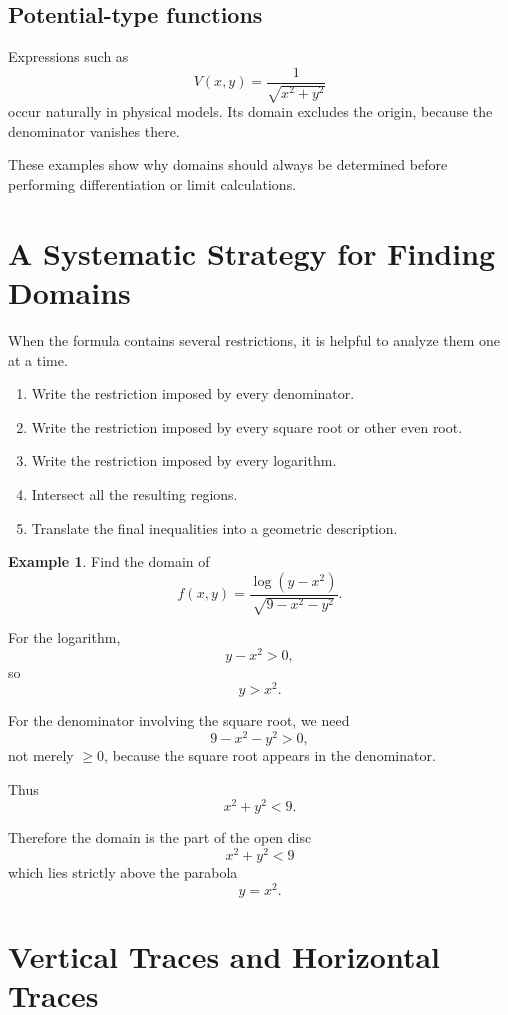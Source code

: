 \documentclass[11pt,oneside]{book}
\theoremstyle{studentthm}
\theoremstyle{definition}
\newtheorem{example}[theorem]{Example}
\begin{document}
\subsection*{Potential-type functions}

Expressions such as
\[
V(x,y)=\frac{1}{\sqrt{x^2+y^2}}
\]
occur naturally in physical models. Its domain excludes the origin,
because the denominator vanishes there.

These examples show why domains should always be determined before
performing differentiation or limit calculations.

\section{A Systematic Strategy for Finding Domains}

When the formula contains several restrictions, it is helpful to
analyze them one at a time.

\begin{enumerate}
\item Write the restriction imposed by every denominator.

\item Write the restriction imposed by every square root or other even
root.

\item Write the restriction imposed by every logarithm.

\item Intersect all the resulting regions.

\item Translate the final inequalities into a geometric description.
\end{enumerate}

\begin{example}
Find the domain of
\[
f(x,y)
=
\frac{\log(y-x^2)}{\sqrt{9-x^2-y^2}}.
\]

For the logarithm,
\[
y-x^2>0,
\]
so
\[
y>x^2.
\]

For the denominator involving the square root, we need
\[
9-x^2-y^2>0,
\]
not merely \(\ge0\), because the square root appears in the
denominator.

Thus
\[
x^2+y^2<9.
\]

Therefore the domain is the part of the open disc
\[
x^2+y^2<9
\]
which lies strictly above the parabola
\[
y=x^2.
\]
\end{example}

\section{Vertical Traces and Horizontal Traces}
\end{document}
